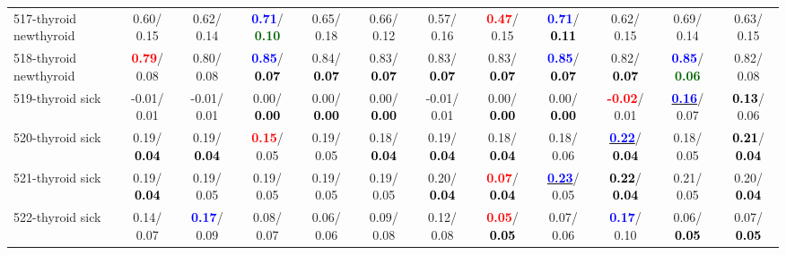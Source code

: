 \begin{table}[h]
\begin{center}
{\begin{tabular}{lc|c|c|c|c|c|c|c|c|c|c}
517-thyroid newthyroid &   0.60/  0.15 &   0.62/  0.14 & \textcolor{blue}{\textbf{  0.71}}/\textcolor{darkgreen}{\textbf{  0.10}} &   0.65/  0.18 &   0.66/  0.12 &   0.57/  0.16 & \textcolor{red}{\textbf{  0.47}}/  0.15 & \textcolor{blue}{\textbf{  0.71}}/\textcolor{black}{\textbf{  0.11}} &   0.62/  0.15 &   0.69/  0.14 &   0.63/  0.15 \\
518-thyroid newthyroid & \textcolor{red}{\textbf{  0.79}}/  0.08 &   0.80/  0.08 & \textcolor{blue}{\textbf{  0.85}}/\textcolor{black}{\textbf{  0.07}} &   0.84/\textcolor{black}{\textbf{  0.07}} &   0.83/\textcolor{black}{\textbf{  0.07}} &   0.83/\textcolor{black}{\textbf{  0.07}} &   0.83/\textcolor{black}{\textbf{  0.07}} & \textcolor{blue}{\textbf{  0.85}}/\textcolor{black}{\textbf{  0.07}} &   0.82/\textcolor{black}{\textbf{  0.07}} & \textcolor{blue}{\textbf{  0.85}}/\textcolor{darkgreen}{\textbf{  0.06}} &   0.82/  0.08 \\
519-thyroid sick &  -0.01/  0.01 &  -0.01/  0.01 &   0.00/\textcolor{black}{\textbf{  0.00}} &   0.00/\textcolor{black}{\textbf{  0.00}} &   0.00/\textcolor{black}{\textbf{  0.00}} &  -0.01/  0.01 &   0.00/\textcolor{black}{\textbf{  0.00}} &   0.00/\textcolor{black}{\textbf{  0.00}} & \textcolor{red}{\textbf{ -0.02}}/  0.01 & \underline{\textcolor{blue}{\textbf{  0.16}}}/  0.07 & \textcolor{black}{\textbf{  0.13}}/  0.06 \\ \hline
520-thyroid sick &   0.19/\textcolor{black}{\textbf{  0.04}} &   0.19/\textcolor{black}{\textbf{  0.04}} & \textcolor{red}{\textbf{  0.15}}/  0.05 &   0.19/  0.05 &   0.18/\textcolor{black}{\textbf{  0.04}} &   0.19/\textcolor{black}{\textbf{  0.04}} &   0.18/\textcolor{black}{\textbf{  0.04}} &   0.18/  0.06 & \underline{\textcolor{blue}{\textbf{  0.22}}}/\textcolor{black}{\textbf{  0.04}} &   0.18/  0.05 & \textcolor{black}{\textbf{  0.21}}/\textcolor{black}{\textbf{  0.04}} \\
521-thyroid sick &   0.19/\textcolor{black}{\textbf{  0.04}} &   0.19/  0.05 &   0.19/  0.05 &   0.19/  0.05 &   0.19/  0.05 &   0.20/\textcolor{black}{\textbf{  0.04}} & \textcolor{red}{\textbf{  0.07}}/\textcolor{black}{\textbf{  0.04}} & \underline{\textcolor{blue}{\textbf{  0.23}}}/  0.05 & \textcolor{black}{\textbf{  0.22}}/\textcolor{black}{\textbf{  0.04}} &   0.21/  0.05 &   0.20/\textcolor{black}{\textbf{  0.04}} \\
522-thyroid sick &   0.14/  0.07 & \textcolor{blue}{\textbf{  0.17}}/  0.09 &   0.08/  0.07 &   0.06/  0.06 &   0.09/  0.08 &   0.12/  0.08 & \textcolor{red}{\textbf{  0.05}}/\textcolor{black}{\textbf{  0.05}} &   0.07/  0.06 & \textcolor{blue}{\textbf{  0.17}}/  0.10 &   0.06/\textcolor{black}{\textbf{  0.05}} &   0.07/\textcolor{black}{\textbf{  0.05}} \\

\end{tabular}}
\end{center}
\end{table}
